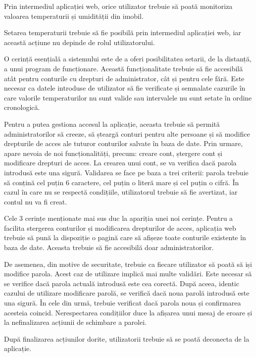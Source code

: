 	Prin intermediul aplicației web, orice utilizator trebuie să poată monitoriza valoarea temperaturii și umidității din imobil.

	Setarea temperaturii trebuie să fie posibilă prin intermediul aplicației web, iar această acțiune nu depinde de rolul utilizatorului.

	O cerință esențială a sistemului este de a oferi posibilitatea setarii, de la distanță, a unui program de funcționare. Această funcționalitate trebuie să fie accesibilă atât pentru conturile cu drepturi de administrator, cât și pentru cele fără. Este necesar ca datele introduse de utilizator să fie verificate și semnalate cazurile în care valorile temperaturilor nu sunt valide sau intervalele nu sunt setate în ordine cronologică.

	Pentru a putea gestiona accesul la aplicație, aceasta trebuie să permită administratorilor să creeze, să șteargă conturi pentru alte persoane și să modifice drepturile de acces ale tuturor conturilor salvate în baza de date. Prin urmare, apare nevoia de noi funcționalități, precum: creare cont, ștergere cont și modificare drepturi de acces. La crearea unui cont, se va verifica dacă parola introdusă este una sigură. Validarea se face pe baza a trei criterii: parola trebuie să conțină cel puțin 6 caractere, cel puțin o literă mare și cel puțin o cifră. În cazul în care nu se respectă condițiile, utilizatorul trebuie să fie avertizat, iar contul nu va fi creat. 

	Cele 3 cerințe menționate mai sus duc la apariția unei noi cerințe. Pentru a facilita stergerea conturilor și modificarea drepturilor de acces, aplicația web trebuie să pună la dispoziție o pagină care să afișeze toate conturile existente în baza de date. Aceasta trebuie să fie accesibilă doar administratorilor.
	 
	De asemenea, din motive de securitate, trebuie ca fiecare utilizator să poată să iși modifice parola. Acest caz de utilizare implică mai multe validări. Este necesar să se verifice dacă parola actuală introdusă este cea corectă. După aceea, identic cazului de utilizare modificare parolă, se verifică dacă noua parolă introdusă este una sigură. În cele din urmă, trebuie verificat dacă parola noua și confirmarea acesteia coincid. Nerespectarea condițiilor duce la afișarea unui mesaj de eroare și la nefinalizarea acțiunii de schimbare a parolei.

	După finalizarea acțiunilor dorite, utilizatorii trebuie să se poată deconecta de la aplicație. 	 

